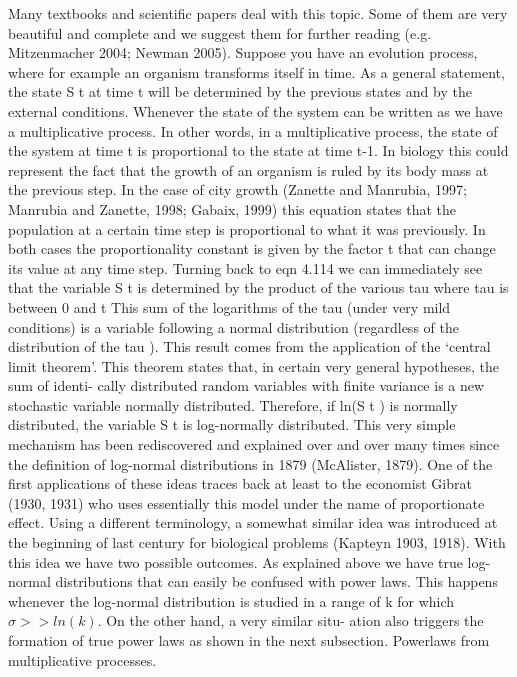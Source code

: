 Many textbooks and scientiﬁc papers deal with this topic. Some of them
are very beautiful and complete and we suggest them for further reading
(e.g. Mitzenmacher 2004; Newman 2005). Suppose you have an evolution
process, where for example an organism transforms itself in time. As a
general statement, the state S t at time t will be determined by the previous
states and by the external conditions. Whenever the state of the system can
be written as we have a multiplicative process. In other words, in a multiplicative process,
the state of the system at time t is proportional to the state at time t-1. In
biology this could represent the fact that the growth of an organism is ruled
by its body mass at the previous step. In the case of city growth (Zanette and
Manrubia, 1997; Manrubia and Zanette, 1998; Gabaix, 1999) this equation
states that the population at a certain time step is proportional to what
it was previously. In both cases the proportionality constant is given by
the factor t that can change its value at any time step. Turning back to
eqn 4.114 we can immediately see that the variable S t is determined by the
product of the various tau where tau is between 0 and t This sum of the logarithms of the tau (under very mild conditions) is a variable following a normal distribution (regardless of the distribution of the tau ).
This result comes from the application of the ‘central limit theorem’. This
theorem states that, in certain very general hypotheses, the sum of identi-
cally distributed random variables with ﬁnite variance is a new stochastic variable normally distributed. Therefore, if ln(S t ) is normally distributed,
the variable S t is log-normally distributed. This very simple mechanism has been rediscovered and explained over
and over many times since the deﬁnition of log-normal distributions in 1879
(McAlister, 1879). One of the ﬁrst applications of these ideas traces back at
least to the economist Gibrat (1930, 1931) who uses essentially this model
under the name of proportionate eﬀect. Using a diﬀerent terminology, a
somewhat similar idea was introduced at the beginning of last century for
biological problems (Kapteyn 1903, 1918).
With this idea we have two possible outcomes. As explained above we
have true log-normal distributions that can easily be confused with power
laws. This happens whenever the log-normal distribution is studied in a
range of k for which $\sigma >> ln(k)$. On the other hand, a very similar situ-
ation also triggers the formation of true power laws as shown in the next
subsection. Powerlaws from multiplicative processes.

